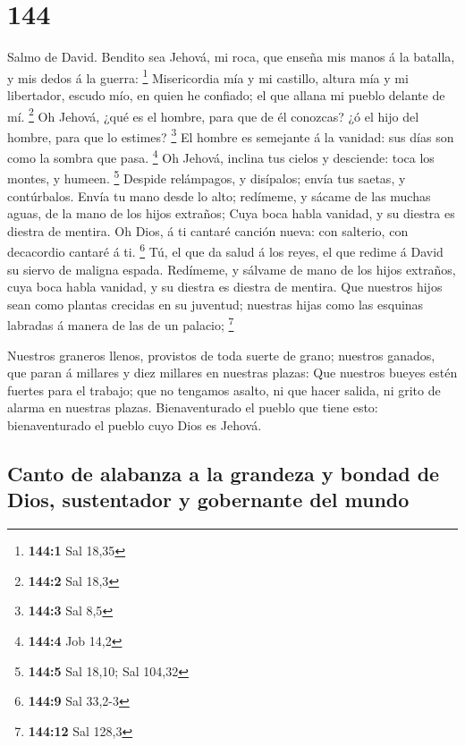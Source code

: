 \hypertarget{section-143}{%
\section{144}\label{section-143}}

 Salmo de David. Bendito sea Jehová, mi roca, que enseña mis
manos á la batalla, y mis dedos á la guerra: \footnote{\textbf{144:1}
  Sal 18,35}  Misericordia mía y mi castillo, altura mía y
mi libertador, escudo mío, en quien he confiado; el que allana mi pueblo
delante de mí. \footnote{\textbf{144:2} Sal 18,3}  Oh
Jehová, ¿qué es el hombre, para que de él conozcas? ¿ó el hijo del
hombre, para que lo estimes? \footnote{\textbf{144:3} Sal 8,5}
 El hombre es semejante á la vanidad: sus días son como la
sombra que pasa. \footnote{\textbf{144:4} Job 14,2}  Oh
Jehová, inclina tus cielos y desciende: toca los montes, y humeen.
\footnote{\textbf{144:5} Sal 18,10; Sal 104,32}  Despide
relámpagos, y disípalos; envía tus saetas, y contúrbalos. 
Envía tu mano desde lo alto; redímeme, y sácame de las muchas aguas, de
la mano de los hijos extraños;  Cuya boca habla vanidad, y
su diestra es diestra de mentira.  Oh Dios, á ti cantaré
canción nueva: con salterio, con decacordio cantaré á ti. \footnote{\textbf{144:9}
  Sal 33,2-3}  Tú, el que da salud á los reyes, el que
redime á David su siervo de maligna espada.  Redímeme, y
sálvame de mano de los hijos extraños, cuya boca habla vanidad, y su
diestra es diestra de mentira.  Que nuestros hijos sean
como plantas crecidas en su juventud; nuestras hijas como las esquinas
labradas á manera de las de un palacio; \footnote{\textbf{144:12} Sal
  128,3}

 Nuestros graneros llenos, provistos de toda suerte de
grano; nuestros ganados, que paran á millares y diez millares en
nuestras plazas:  Que nuestros bueyes estén fuertes para el
trabajo; que no tengamos asalto, ni que hacer salida, ni grito de alarma
en nuestras plazas.  Bienaventurado el pueblo que tiene
esto: bienaventurado el pueblo cuyo Dios es Jehová.

\hypertarget{canto-de-alabanza-a-la-grandeza-y-bondad-de-dios-sustentador-y-gobernante-del-mundo}{%
\subsection{Canto de alabanza a la grandeza y bondad de Dios,
sustentador y gobernante del
mundo}\label{canto-de-alabanza-a-la-grandeza-y-bondad-de-dios-sustentador-y-gobernante-del-mundo}}

